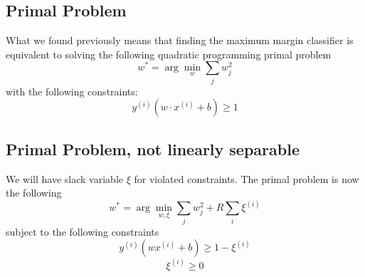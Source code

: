 \documentclass[twoside,11pt]{article}
\theoremstyle{definition}
\begin{document}
\newpage

\subsection{Primal Problem}

What we found previously means that finding the maximum margin classifier is equivalent to solving the following quadratic programming primal problem
\[
w^{*} = \arg \min_{w} \sum_j w_j^2
\]
with the following constraints:
\[
y^{(i)} ( w \cdot x^{(i)} + b) \geq 1
\]

\subsection{Primal Problem, not linearly separable}

We will have slack variable $\xi$ for violated constraints. The primal problem is now the following
\[
w^{*} = \arg \min_{w,\xi} \sum_j w_j^2 + R \sum_i \xi^{(i)}
\]
subject to the following constraints
\[
y^{(i)} (w x^{(i)} + b) \geq 1 - \xi^{(i)}
\]
\[
\xi^{(i)} \geq 0
\]
\end{document}
